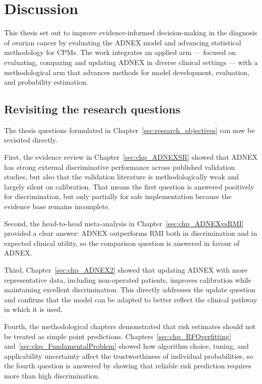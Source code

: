 \chapter{Discussion}
\label{ch:discussion}


This thesis set out to improve evidence-informed decision-making in the diagnosis of ovarian cancer by evaluating the \gls{ADNEX} model and advancing statistical methodology for \glspl{CPM}. The work integrates an applied arm --- focused on evaluating, comparing and updating \gls{ADNEX} in diverse clinical settings --- with a methodological arm that advances methods for model development, evaluation, and probability estimation. 

\section{Revisiting the research questions}

The thesis questions formulated in Chapter~\ref{sec:research_objectives} can now be revisited directly.

First, the evidence review in Chapter~\ref{sec:chp_ADNEXSR} showed that \gls{ADNEX} has strong external discriminative performance across published validation studies, but also that the validation literature is methodologically weak and largely silent on calibration. That means the first question is answered positively for discrimination, but only partially for safe implementation because the evidence base remains incomplete.

Second, the head-to-head meta-analysis in Chapter~\ref{sec:chp_ADNEXvsRMI} provided a clear answer: \gls{ADNEX} outperforms \gls{RMI} both in discrimination and in expected clinical utility, so the comparison question is answered in favour of \gls{ADNEX}.

Third, Chapter~\ref{sec:chp_ADNEX2} showed that updating \gls{ADNEX} with more representative data, including non-operated patients, improves calibration while maintaining excellent discrimination. This directly addresses the update question and confirms that the model can be adapted to better reflect the clinical pathway in which it is used.

Fourth, the methodological chapters demonstrated that risk estimates should not be treated as simple point predictions. Chapters~\ref{sec:chp_RFOverfitting} and~\ref{sec:chp_FundamentalProblem} showed how algorithm choice, tuning, and applicability uncertainty affect the trustworthiness of individual probabilities, so the fourth question is answered by showing that reliable risk prediction requires more than high discrimination.

